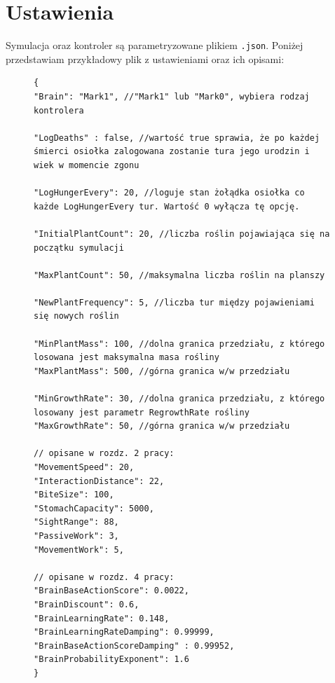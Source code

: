 \section{Ustawienia}
Symulacja oraz kontroler są parametryzowane plikiem \texttt{.json}. Poniżej przedstawiam przykładowy plik z ustawieniami oraz ich opisami:
\begin{figure}[h]
\label{fig:example_settings}
\begin{lstlisting}[language=json_comment]
{
"Brain": "Mark1", //"Mark1" lub "Mark0", wybiera rodzaj kontrolera

"LogDeaths" : false, //wartość true sprawia, że po każdej śmierci osiołka zalogowana zostanie tura jego urodzin i wiek w momencie zgonu

"LogHungerEvery": 20, //loguje stan żołądka osiołka co każde LogHungerEvery tur. Wartość 0 wyłącza tę opcję.

"InitialPlantCount": 20, //liczba roślin pojawiająca się na początku symulacji

"MaxPlantCount": 50, //maksymalna liczba roślin na planszy

"NewPlantFrequency": 5, //liczba tur między pojawieniami się nowych roślin

"MinPlantMass": 100, //dolna granica przedziału, z którego losowana jest maksymalna masa rośliny
"MaxPlantMass": 500, //górna granica w/w przedziału

"MinGrowthRate": 30, //dolna granica przedziału, z którego losowany jest parametr RegrowthRate rośliny
"MaxGrowthRate": 50, //górna granica w/w przedziału

// opisane w rozdz. 2 pracy:
"MovementSpeed": 20,         
"InteractionDistance": 22,         
"BiteSize": 100,         
"StomachCapacity": 5000,        
"SightRange": 88, 
"PassiveWork": 3,
"MovementWork": 5,

// opisane w rozdz. 4 pracy:
"BrainBaseActionScore": 0.0022,
"BrainDiscount": 0.6,        
"BrainLearningRate": 0.148,        
"BrainLearningRateDamping": 0.99999,         
"BrainBaseActionScoreDamping" : 0.99952,         
"BrainProbabilityExponent": 1.6 
}
\end{lstlisting}
\end{figure}
